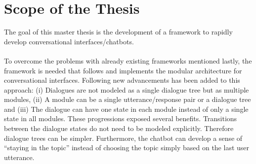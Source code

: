 \section{Scope of the Thesis}
The goal of this master thesis is the development of a framework to rapidly develop conversational interfaces/chatbots.
\\~\\
To overcome the problems with already existing frameworks mentioned lastly, the framework is needed that follows and implements the modular architecture for conversational interfaces. Following new advancements has been added to this approach: (i) Dialogues are not modeled as a single dialogue tree but as multiple modules, (ii) A module can be a single utterance/response pair or a dialogue tree and (iii) The dialogue can have one state in each module instead of only a single state in all modules. These progressions exposed several benefits. Transitions between the dialogue states do not need to be modeled explicitly. Therefore dialogue trees can be simpler. Furthermore, the chatbot can develop a sense of “staying in the topic” instead of choosing the topic simply based on the last user utterance.

